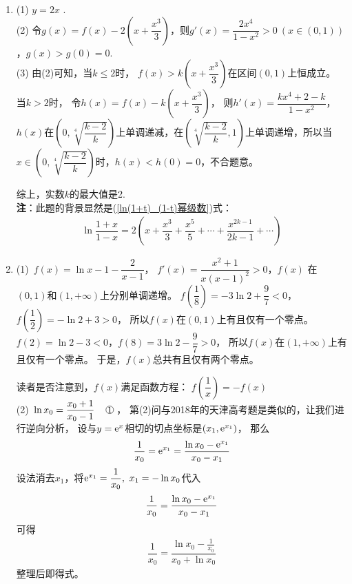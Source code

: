 \begin{enumerate}[label={\textbf{\arabic*.}},leftmargin=
    \inteval{\myenumleftmargin}pt]
必须有$ h(1)=8-K\geq 0,\ K\leq 8 $，否则，若$ K>8 $，则$ \Delta=K^2-60>0 $，
$ g(x) $在$ \left[1,\dfrac{K+\sqrt{K^2-60}}{10}\right] $上单调递减，
$ g(x)<g(1)=0 $，不合题意。当$ K=8 $时，$ h(x) $在区间
$ \left(\dfrac{4}{5},+\infty\right) $上单调递增，$ h(x)\geq h(1)=0 $，
$ g'(x)=\dfrac{h(x)}{x^2}\geq 0 $，$ g(x)\geq g(1)=0 $.

所以，$ K $的最大值是8.

\item (1) $ y=2x $ .\\
(2) 令$ g(x)=f(x)-2\left(x+\dfrac{x^{3}}{3}\right) $，则$ g'(x)=
\dfrac{2x^4}{1-x^2}>0\ (x\in(0,1)) $，$ g(x)>g(0)=0 $. \\
(3)  由(2)可知，当$ k\leq 2 $时， $ f(x)>k\left(x+
\dfrac{x^{3}}{3}\right) $在区间$ (0,1) $上恒成立。
当$ k>2 $时， 令$ h(x)=f(x)-k\left(x+\dfrac{x^{3}}{3}\right) $，
则$ h'(x)=\dfrac{k x^{4}+2-k}{1-x^{2}} $，
$ h(x) $在$ \left(0,\sqrt[4]{\dfrac{k-2}{k}}
\right) $上单调递减，在$ \left(\sqrt[4]{\dfrac{k-2}{k}},
1\right) $上单调递增，所以当 $ x\in\left(0,\sqrt[4]{\dfrac{k-2}{k}}
\right) $时，$ h(x)<h(0)=0 $，不合题意。

综上，实数$ k $的最大值是2. \\
\textbf{注}：此题的背景显然是(\ref{ln(1+t)_(1-t)幂级数})式：
\begin{align*}
    \ln\dfrac{1+x}{1-x}=2\left(x+\dfrac{x^3}{3}+\dfrac{x^5}{5}+\cdots +\dfrac{x^{2k-1}}{2k-1} +\cdots \right)
\end{align*}

\item (1)\ $ f(x)=\ln x-1-\dfrac{2}{x-1} $，
$ f'(x)=\dfrac{x^2+1}{x(x-1)^2}>0 $，$ f(x) $
在$ (0,1) $和$ (1,+\infty) $上分别单调递增。
$ f\left(\dfrac{1}{8}\right)=-3\ln 2+\dfrac{9}{7}<0 $，
$ f\left(\dfrac{1}{2}\right)=-\ln2+3>0 $，
所以$ f(x) $在$ (0,1) $上有且仅有一个零点。
$ f(2)=\ln 2-3<0 $，$ f(8)=3\ln 2-\dfrac{9}{7}>0 $，
所以$ f(x) $在$ (1,+\infty) $上有且仅有一个零点。
于是，$ f(x) $总共有且仅有两个零点。

读者是否注意到，$ f(x) $满足函数方程：
$ f\left(\dfrac{1}{x}\right)=-f(x) $ \\
(2)\ $ \ln x_0=\dfrac{x_0+1}{x_0-1}\q \mycircled{1} $，
第(2)问与2018年的天津高考题是类似的，让我们进行逆向分析，
设与$ y=\mathrm{e}^x $相切的切点坐标是$ (x_1,\mathrm{e}^{x_1}) $，
那么
\begin{gather*}
    \dfrac{1}{x_0}=\mathrm{e}^{x_1}=\dfrac{\ln x_0-\mathrm{e}^{x_1}}{x_0-x_1}
\end{gather*}
设法消去$ x_1 $，将$ \mathrm{e}^{x_1}=\dfrac{1}{x_0},\ x_1=-\ln x_0 $代入
\begin{gather*}
    \dfrac{1}{x_0}=\dfrac{\ln x_0-\mathrm{e}^{x_1}}{x_0-x_1}
\end{gather*}
可得
\begin{gather*}
    \dfrac{1}{x_0}=\dfrac{\ln x_0-\frac{1}{x_0}}{x_0+\ln x_0}
\end{gather*}
整理后即得式。


\end{enumerate}
